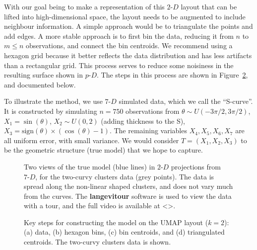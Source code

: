 \documentclass[
  12pt]{article}
\newcommand\pD{$p\text{-}D$}
\newcommand\gD{$2\text{-}D$}
\begin{document}
With our goal being to make a representation of this \gD{} layout that
can be lifted into high-dimensional space, the layout needs to be
augmented to include neighbour information. A simple approach would be
to triangulate the points and add edges. A more stable approach is to
first bin the data, reducing it from \(n\) to \(m\leq n\) observations,
and connect the bin centroids. We recommend using a hexagon grid because
it better reflects the data distribution and has less artifacts than a
rectangular grid. This process serves to reduce some noisiness in the
resulting surface shown in \pD{}. The steps in this process are shown in
Figure~\ref{fig-NLDR-two-curvy}, and documented below.

To illustrate the method, we use \(7\text{-}D\) simulated data, which we
call the ``S-curve''. It is constructed by simulating \(n=750\)
observations from \(\theta \sim U(-3\pi/2, 3\pi/2)\),
\(X_1 = \sin(\theta)\), \(X_2 \sim U(0, 2)\) (adding thickness to the
S), \(X_3 = \text{sign}(\theta) \times (\cos(\theta) - 1)\). The
remaining variables \(X_4, X_5, X_6, X_7\) are all uniform error, with
small variance. We would consider \(T=(X_1, X_2, X_3)\) to be the
geometric structure (true model) that we hope to capture.

\begin{figure}[H]


\caption{\label{fig-two-curvy-true-proj}Two views of the true model
(blue lines) in \(2\text{-}D\) projections from \(7\text{-}D\), for the
two-curvy clusters data (grey points). The data is spread along the
non-linear shaped clusters, and does not vary much from the curves. The
\textbf{langevitour} software is used to view the data with a tour, and
the full video is available at \textless\textgreater.}

\end{figure}%

\begin{figure}


\caption{\label{fig-NLDR-two-curvy}Key steps for constructing the model
on the UMAP layout (\(k=2\)): (a) data, (b) hexagon bins, (c) bin
centroids, and (d) triangulated centroids. The two-curvy clusters data
is shown.}

\end{figure}%
\end{document}
